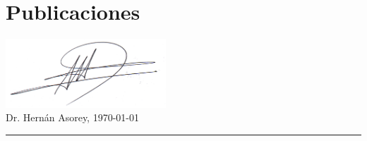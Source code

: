 \documentclass[11pt, a4paper]{article}
\newif\ifeng
\newif\ifres
\begin{document}




\ifres
~
\else

\fi




\ifres
  
\else
  
  \ifeng
    \section*{Publications}
  \else  
    \section*{Publicaciones}
  \fi
  
  
  
  
  
  
\fi
\vspace{-0.5cm}
\begin{flushright}
\includegraphics[width=0.45\textwidth]{firma}\\
\vspace*{-0.5cm}
Dr. Hernán Asorey, \today
\end{flushright}
\hrule
\ifres
\else
\appendix
  
  
\fi
\end{document}
